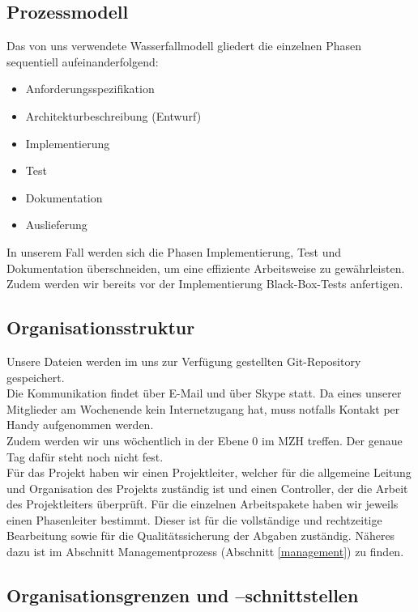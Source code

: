 \documentclass[fontsize=12pt,paper=a4,twoside]{scrartcl}
\begin{document}
\subsection{Prozessmodell}
\label{sec:prozessmodell}

Das von uns verwendete Wasserfallmodell gliedert die einzelnen Phasen sequentiell aufeinanderfolgend:\\
\begin{itemize}
\item Anforderungsspezifikation
\item Architekturbeschreibung (Entwurf)
\item Implementierung
\item Test
\item Dokumentation
\item Auslieferung
\end{itemize}
In unserem Fall werden sich die Phasen Implementierung, Test und Dokumentation überschneiden, um eine effiziente Arbeitsweise zu gewährleisten. Zudem werden wir bereits vor der Implementierung Black-Box-Tests anfertigen.

\subsection{Organisationsstruktur}

Unsere Dateien werden im uns zur Verfügung gestellten Git-Repository gespeichert.\\
Die Kommunikation findet über E-Mail und über Skype statt. Da eines unserer Mitglieder am Wochenende kein Internetzugang hat, muss notfalls Kontakt per Handy aufgenommen werden. \\ 
Zudem werden wir uns wöchentlich in der Ebene 0 im MZH treffen. Der genaue Tag dafür steht noch nicht fest.\\ 
Für das Projekt haben wir einen Projektleiter, welcher für die allgemeine Leitung und Organisation des Projekts zuständig ist und einen Controller, der die Arbeit des Projektleiters überprüft. Für die einzelnen Arbeitspakete haben wir jeweils einen Phasenleiter bestimmt. Dieser ist für die vollständige und rechtzeitige Bearbeitung sowie für die Qualitätssicherung der Abgaben zuständig. Näheres dazu ist im Abschnitt Managementprozess (Abschnitt \ref{management}) zu finden.

\newpage
\subsection{Organisationsgrenzen und --schnittstellen}
\end{document}
